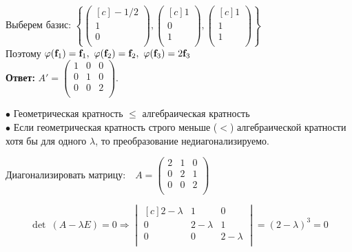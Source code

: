 	Выберем базис: $\left\{
		\left(
	\begin{smallmatrix*}[c]
	-1/2\\ 1\\ 0\\
	\end{smallmatrix*}
		\right) 
	,
		\left(
	\begin{smallmatrix*}[c]
	1\\ 0\\ 1\\
	\end{smallmatrix*}
		\right) 
	,
		\left(
	\begin{smallmatrix*}[c]
	1\\ 1\\ 1\\
	\end{smallmatrix*}
		\right) 
	\right\}$\\
	
	Поэтому $\varphi(\textbf{f$_1$})=\textbf{f$_1$},~\varphi(\textbf{f$_2$})=\textbf{f$_2$},~\varphi(\textbf{\textbf{f$_3$}})=2\textbf{f$_3$}$\\ %
	
\textbf{Ответ:} $A'=\begin{pmatrix}
1 & 0 & 0\\
0 & 1 & 0\\
0 & 0 & 2\\
\end{pmatrix}.$

	\bigskip
	
	$\bullet$ Геометрическая кратность $\le$ алгебраическая кратность\\
	
	$\bullet$ Если геометрическая кратность строго меньше ($<$) алгебраической кратности хотя бы для одного $\lambda$, то преобразование \textsf{недиагонализируемо}.
	
	\begin{prim}
Диагонализировать матрицу:~~$A=\begin{pmatrix}
2 & 1 & 0\\
0 & 2 & 1\\
0 & 0 & 2\\
\end{pmatrix}$\\
	\end{prim}
	
$$
\det~(A - \lambda E) = 0 \Rightarrow
\begin{vmatrix*}[c]
        2-\lambda & 1 & 0\\
        0 & 2-\lambda  & 1\\
        0 & 0  & 2-\lambda\\
\end{vmatrix*}
= (2-\lambda)^3= 0 $$

